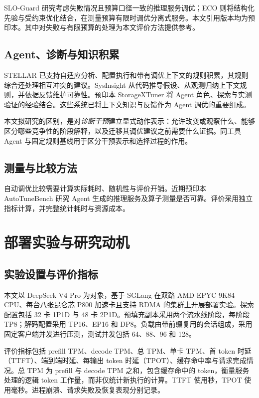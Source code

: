\documentclass[UTF8,11pt,a4paper,fontset=windows]{ctexart}
\begin{document}
SLO-Guard 研究考虑失败情况且预算口径一致的推理服务调优；ECO 则将结构化先验与受约束优化结合，在测量预算有限时调优分离式服务\cite{sloguard2026,ecotuning2026}。本文引用版本均为预印本。其中对失败与有限预算的处理为本文评价方法提供参考。

\subsection{Agent、诊断与知识积累}
STELLAR 已支持自适应分析、配置执行和带有调优上下文的规则积累，其规则综合还处理相互冲突的建议\cite{stellar2025}。SysInsight 从代码推导假设、从观测归纳上下文规则，并依据反馈维护可靠性\cite{sysinsight2026}。预印本 StorageXTuner 将 Agent 角色、探索与实测验证的经验结合\cite{storagextuner2025}。这些系统已将上下文知识与反馈作为 Agent 调优的重要组成。

本文拟研究的区别，是对\emph{诊断干预}建立显式动作表示：允许改变或观察什么、能够区分哪些竞争性的阶段解释，以及迁移其调优建议之前需要什么证据。同工具 Agent 与固定规则基线用于区分干预表示和选择过程的作用。

\subsection{测量与比较方法}
自动调优比较需要计算实际耗时、随机性与评价开销\cite{methodology2024}。近期预印本 AutoTuneBench 研究 Agent 生成的推理服务及算子测量是否可靠\cite{autotunebench2026}。评价采用独立指标计算，并完整统计耗时与资源成本。

\section{部署实验与研究动机}
\label{sec:historical}
\subsection{实验设置与评价指标}
本文以 DeepSeek V4 Pro 为对象，基于 SGLang 在双路 AMD EPYC 9K84 CPU、每台八张昆仑芯 P800 加速卡且支持 RDMA 的集群上开展部署实验。探索配置包括 32 卡 1P1D 与 48 卡 2P1D。预填充副本采用两个流水线阶段，每阶段 TP8；解码配置采用 TP16、EP16 和 DP8。负载由带前缀复用的会话组成，采用固定客户端并发进行压测，测试并发包括 64、88、96 和 128。

评价指标包括 prefill TPM、decode TPM、总 TPM、单卡 TPM、首 token 时延（TTFT）、端到端时延、每输出 token 时延（TPOT）、缓存命中率与请求完成情况。总 TPM 为 prefill 与 decode TPM 之和，包含缓存命中的 token，衡量服务处理的逻辑 token 工作量，而非仅统计新执行的计算。TTFT 使用秒，TPOT 使用毫秒。进程崩溃、请求失败及恢复表现分别记录。
\end{document}

